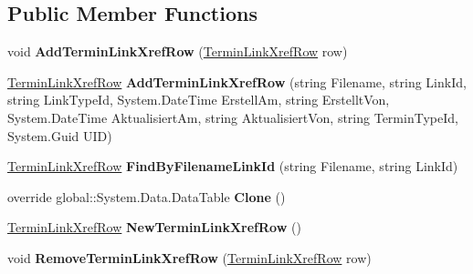 \subsection*{Public Member Functions}
\begin{DoxyCompactItemize}
\item 
void {\bfseries Add\+Termin\+Link\+Xref\+Row} (\hyperlink{class_products_1_1_data_1_1ds_sage_1_1_termin_link_xref_row}{Termin\+Link\+Xref\+Row} row)\hypertarget{class_products_1_1_data_1_1ds_sage_1_1_termin_link_xref_data_table_a357303a8f46d01d63dcc46db2cfef62c}{}\label{class_products_1_1_data_1_1ds_sage_1_1_termin_link_xref_data_table_a357303a8f46d01d63dcc46db2cfef62c}

\item 
\hyperlink{class_products_1_1_data_1_1ds_sage_1_1_termin_link_xref_row}{Termin\+Link\+Xref\+Row} {\bfseries Add\+Termin\+Link\+Xref\+Row} (string Filename, string Link\+Id, string Link\+Type\+Id, System.\+Date\+Time Erstell\+Am, string Erstellt\+Von, System.\+Date\+Time Aktualisiert\+Am, string Aktualisiert\+Von, string Termin\+Type\+Id, System.\+Guid U\+ID)\hypertarget{class_products_1_1_data_1_1ds_sage_1_1_termin_link_xref_data_table_a54a37a43709051101319855d48f56cb5}{}\label{class_products_1_1_data_1_1ds_sage_1_1_termin_link_xref_data_table_a54a37a43709051101319855d48f56cb5}

\item 
\hyperlink{class_products_1_1_data_1_1ds_sage_1_1_termin_link_xref_row}{Termin\+Link\+Xref\+Row} {\bfseries Find\+By\+Filename\+Link\+Id} (string Filename, string Link\+Id)\hypertarget{class_products_1_1_data_1_1ds_sage_1_1_termin_link_xref_data_table_a7a0a1f921f66e20f9a4ef364e2ae9cdd}{}\label{class_products_1_1_data_1_1ds_sage_1_1_termin_link_xref_data_table_a7a0a1f921f66e20f9a4ef364e2ae9cdd}

\item 
override global\+::\+System.\+Data.\+Data\+Table {\bfseries Clone} ()\hypertarget{class_products_1_1_data_1_1ds_sage_1_1_termin_link_xref_data_table_a4f9a99109c0cf6dc859969b35d9aaacb}{}\label{class_products_1_1_data_1_1ds_sage_1_1_termin_link_xref_data_table_a4f9a99109c0cf6dc859969b35d9aaacb}

\item 
\hyperlink{class_products_1_1_data_1_1ds_sage_1_1_termin_link_xref_row}{Termin\+Link\+Xref\+Row} {\bfseries New\+Termin\+Link\+Xref\+Row} ()\hypertarget{class_products_1_1_data_1_1ds_sage_1_1_termin_link_xref_data_table_a8487c3839865824fc6bc0c422f78dcd1}{}\label{class_products_1_1_data_1_1ds_sage_1_1_termin_link_xref_data_table_a8487c3839865824fc6bc0c422f78dcd1}

\item 
void {\bfseries Remove\+Termin\+Link\+Xref\+Row} (\hyperlink{class_products_1_1_data_1_1ds_sage_1_1_termin_link_xref_row}{Termin\+Link\+Xref\+Row} row)\hypertarget{class_products_1_1_data_1_1ds_sage_1_1_termin_link_xref_data_table_a680f29f00410c497628f127987d199d4}{}\label{class_products_1_1_data_1_1ds_sage_1_1_termin_link_xref_data_table_a680f29f00410c497628f127987d199d4}

\end{DoxyCompactItemize}
